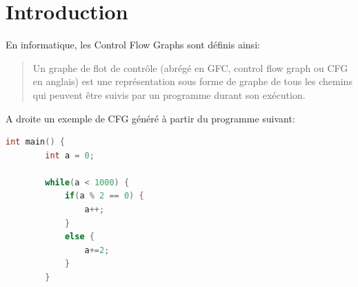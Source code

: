 \section{Introduction}
\begin{multicols}{2}
En informatique, les Control Flow Graphs sont définis ainsi:
\begin{quotation}
    Un graphe de flot de contrôle (abrégé en GFC, control flow graph ou CFG en anglais) est une représentation sous forme de graphe de tous les chemins qui peuvent être suivis par un programme durant son exécution. \cite{wiki:Graphe_de_flot_de_controle}
\end{quotation}
A droite un exemple de CFG généré à partir du programme suivant:
\begin{lstlisting}[language=c]
    int main() {
        int a = 0;
        
        while(a < 1000) {
            if(a % 2 == 0) {
                a++;
            }
            else {
                a+=2;
            }
        }
    

\end{lstlisting}
\end{multicols}
